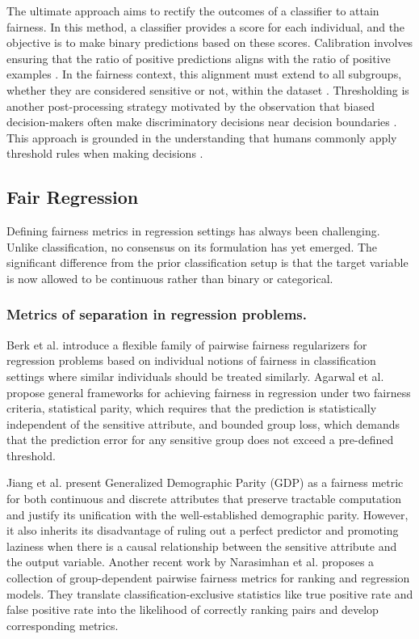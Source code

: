 The ultimate approach aims to rectify the outcomes of a classifier to attain fairness. In this method, a classifier provides a score for each individual, and the objective is to make binary predictions based on these scores. Calibration involves ensuring that the ratio of positive predictions aligns with the ratio of positive examples \cite{dawid1982well}. In the fairness context, this alignment must extend to all subgroups, whether they are considered sensitive or not, within the dataset \cite{chen2018my}. Thresholding is another post-processing strategy motivated by the observation that biased decision-makers often make discriminatory decisions near decision boundaries \cite{kamiran2012decision}. This approach is grounded in the understanding that humans commonly apply threshold rules when making decisions \cite{kleinberg2018human}.

\subsection{Fair Regression}
Defining fairness metrics in regression settings has always been challenging. Unlike classification, no consensus on its formulation has yet emerged. The significant difference from the prior classification setup is that the target variable is now allowed to be continuous rather than binary or categorical.

\subsubsection{Metrics of separation in regression problems.}

Berk et al. \cite{berk2017convex} introduce a flexible family of pairwise fairness regularizers for regression problems based on individual notions of fairness in classification settings where similar individuals should be treated similarly. Agarwal et al. \cite{agarwal2019fair} propose general frameworks for achieving fairness in regression under two fairness criteria, statistical parity, which requires that the prediction is statistically independent of the sensitive attribute, and bounded group loss, which demands that the prediction error for any sensitive group does not exceed a pre-defined threshold.

Jiang et al.\cite{jiang2022generalized} present Generalized Demographic Parity (GDP) as a fairness metric for both continuous and discrete attributes that preserve tractable computation and justify its unification with the well-established demographic parity. However, it also inherits its disadvantage of ruling out a perfect predictor and promoting laziness when there is a causal relationship between the sensitive attribute and the output variable. Another recent work by Narasimhan et al.\cite{narasimhan2020pairwise} proposes a collection of group-dependent pairwise fairness metrics for ranking and regression models. They translate classification-exclusive statistics like true positive rate and false positive rate into the likelihood of correctly ranking pairs and develop corresponding metrics.

